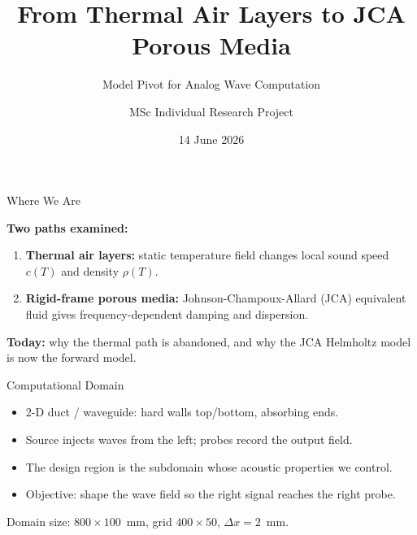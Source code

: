 \documentclass[aspectratio=169,11pt]{beamer}
\title{From Thermal Air Layers to JCA Porous Media}
\subtitle{Model Pivot for Analog Wave Computation}
\author{MSc Individual Research Project}
\institute{Cranfield University\hspace{0.3cm}|\hspace{0.3cm}Supervisors: Prof. Weisi Guo, Prof. Takis Tsoutsanis}
\date{14 June 2026}
\begin{document}
\begin{frame}[plain]
  \titlepage
\end{frame}

\begin{frame}{Where We Are}
 
  \vspace{0.3cm}
  \textbf{Two paths examined:}
  \begin{enumerate}
    \item \textbf{Thermal air layers:} static temperature field changes local sound speed $c(T)$ and density $\rho(T)$.
    \item \textbf{Rigid-frame porous media:} Johnson-Champoux-Allard (JCA) equivalent fluid gives frequency-dependent damping and dispersion.
  \end{enumerate}

  \vspace{0.3cm}
  \textbf{Today:} why the thermal path is abandoned, and why the JCA Helmholtz model is now the forward model.
\end{frame}

\begin{frame}{Computational Domain}
  \begin{center}
  \end{center}

  \vspace{0.2cm}
  \footnotesize
  \begin{itemize}
    \item 2-D duct / waveguide: hard walls top/bottom, absorbing ends.
    \item Source injects waves from the left; probes record the output field.
    \item The design region is the subdomain whose acoustic properties we control.
    \item Objective: shape the wave field so the right signal reaches the right probe.
  \end{itemize}

  \vspace{0.1cm}
  \textcolor{gdpDarkBlue}{\small Domain size: $800 \times 100$~mm, grid $400 \times 50$, $\Delta x = 2$~mm.}
\end{frame}
\end{document}

